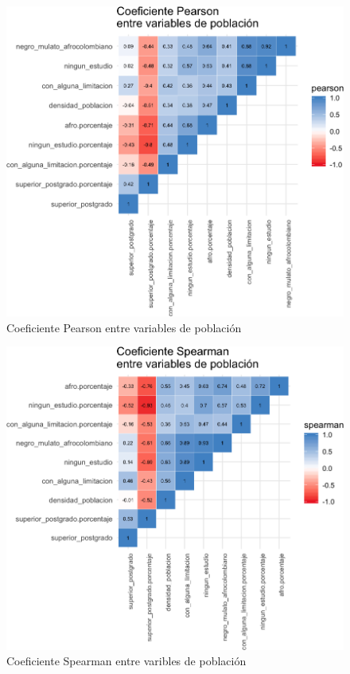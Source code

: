 \documentclass[12pt,a4paper,openany]{book}
\theoremstyle{definition}
\theoremstyle{definition}
\theoremstyle{definition}
\theoremstyle{remark}
\begin{document}
\begin{figure}

{\centering \includegraphics[width=1\linewidth]{tesis-unigis_files/figure-latex/tile-poblacion-pearson-1} 

}

\caption{Coeficiente Pearson entre variables de población}\label{fig:tile-poblacion-pearson}
\end{figure}

\begin{figure}

{\centering \includegraphics[width=1\linewidth]{tesis-unigis_files/figure-latex/tile-poblacion-spearman-1} 

}

\caption{Coeficiente Spearman entre varibles de población}\label{fig:tile-poblacion-spearman}
\end{figure}
\end{document}
